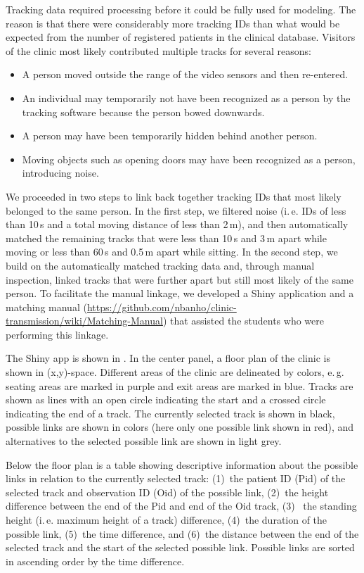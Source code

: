 \documentclass[fleqn,11pt]{wlscirep_supp}
\newcommand\ie{i.\,e.\xspace}
\newcommand\eg{e.\,g.\xspace}
\begin{document}
Tracking data required processing before it could be fully used for modeling. The reason is that there were considerably more tracking IDs than what would be expected from the number of registered patients in the clinical database. Visitors of the clinic most likely contributed multiple tracks for several reasons: 
\begin{itemize}
    \item A person moved outside the range of the video sensors and then re-entered. 
    \item An individual may temporarily not have been recognized as a person by the tracking software because the person bowed downwards.
    \item A person may have been temporarily hidden behind another person.
    \item Moving objects such as opening doors may have been recognized as a person, introducing noise.
\end{itemize}
We proceeded in two steps to link back together tracking IDs that most likely belonged to the same person. In the first step, we filtered noise (\ie IDs of less than 10\,s and a total moving distance of less than 2\,m), and then automatically matched the remaining tracks that were less than 10\,s and 3\,m apart while moving or less than 60\,s and 0.5\,m apart while sitting. In the second step, we build on the automatically matched tracking data and, through manual inspection, linked tracks that were further apart but still most likely of the same person. To facilitate the manual linkage, we developed a Shiny application and a matching manual (\url{https://github.com/nbanho/clinic-transmission/wiki/Matching-Manual}) that assisted the students who were performing this linkage. 

The Shiny app is shown in . In the center panel, a floor plan of the clinic is shown in (x,y)-space. Different areas of the clinic are delineated by colors, \eg seating areas are marked in purple and exit areas are marked in blue. Tracks are shown as lines with an open circle indicating the start and a crossed circle indicating the end of a track. The currently selected track is shown in black, possible links are shown in colors (here only one possible link shown in red), and alternatives to the selected possible link are shown in light grey. 

Below the floor plan is a table showing descriptive information about the possible links in relation to the currently selected track: (1)~the patient ID (Pid) of the selected track and observation ID (Oid) of the possible link, (2)~the height difference between the end of the Pid and end of the Oid track, (3)~ the standing height (\ie maximum height of a track) difference, (4)~the duration of the possible link, (5)~the time difference, and (6)~the distance between the end of the selected track and the start of the selected possible link. Possible links are sorted in ascending order by the time difference. 
\end{document}
